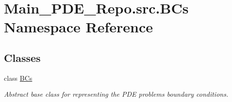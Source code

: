\hypertarget{namespaceMain__PDE__Repo_1_1src_1_1BCs}{}\section{Main\+\_\+\+P\+D\+E\+\_\+\+Repo.\+src.\+B\+Cs Namespace Reference}
\label{namespaceMain__PDE__Repo_1_1src_1_1BCs}
\subsection*{Classes}
\begin{DoxyCompactItemize}
\item 
class \hyperlink{classMain__PDE__Repo_1_1src_1_1BCs_1_1BCs}{B\+Cs}
\begin{DoxyCompactList}\small\item\em Abstract base class for representing the P\+DE problem\textquotesingle{}s boundary conditions. \end{DoxyCompactList}\end{DoxyCompactItemize}
